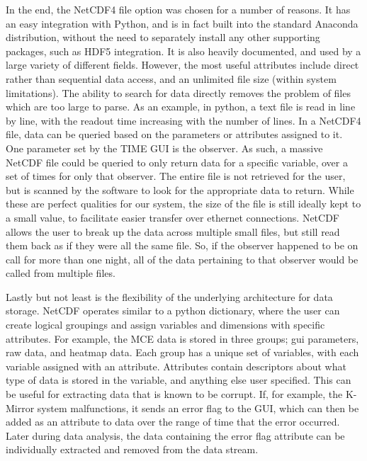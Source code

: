 \documentclass[manuscript]{aastex}
\begin{document}
In the end, the NetCDF4 file option was chosen for a number of reasons. It has an easy integration with Python, and is in fact built into the standard {\sc Anaconda} distribution, without the need to separately install any other supporting packages, such as HDF5 integration. It is also heavily documented, and used by a large variety of different fields. However, the most useful attributes include direct rather than sequential data access, and an unlimited file size (within system limitations). The ability to search for data directly removes the problem of files which are too large to parse. As an example, in python, a text file is read in line by line, with the readout time increasing with the number of lines. In a NetCDF4 file, data can be queried based on the parameters or attributes assigned to it. One parameter set by the TIME GUI is the observer. As such, a massive NetCDF file could be queried to only return data for a specific variable, over a set of times for only that observer. The entire file is not retrieved for the user, but is scanned by the software to look for the appropriate data to return. While these are perfect qualities for our system, the size of the file is still ideally kept to a small value, to facilitate easier transfer over ethernet connections. NetCDF allows the user to break up the data across multiple small files, but still read them back as if they were all the same file. So, if the observer happened to be on call for more than one night, all of the data pertaining to that observer would be called from multiple files. 

Lastly but not least is the flexibility of the underlying architecture for data storage. NetCDF operates similar to a python dictionary, where the user can create logical groupings and assign variables and dimensions with specific attributes. For example, the MCE data is stored in three groups; gui parameters, raw data, and heatmap data. Each group has a unique set of variables, with each variable assigned with an attribute. Attributes contain descriptors about what type of data is stored in the variable, and anything else user specified. This can be useful for extracting data that is known to be corrupt. If, for example, the K-Mirror system malfunctions, it sends an error flag to the GUI, which can then be added as an attribute to data over the range of time that the error occurred. Later during data analysis, the data containing the error flag attribute can be individually extracted and removed from the data stream. 
\end{document}
